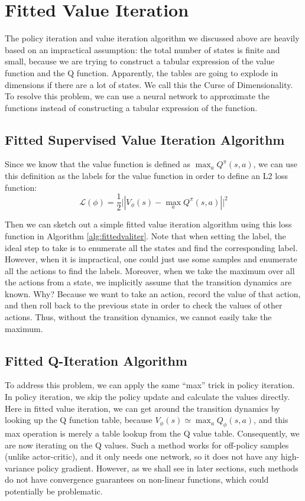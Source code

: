 \section{Fitted Value Iteration}
The policy iteration and value iteration algorithm we discussed above are heavily based on an impractical assumption: the total number of states is finite and small, because we are trying to construct a tabular expression of the value function and the Q function. Apparently, the tables are going to explode in dimensions if there are a lot of states. We call this the Curse of Dimensionality. To resolve this problem, we can use a neural network to approximate the functions instead of constructing a tabular expression of the function. 

\subsection{Fitted Supervised Value Iteration Algorithm}
Since we know that the value function is defined as $\max_a Q^\pi(s,a)$, we can use this definition as the labels for the value function in order to define an L2 loss function:
$$\mathcal{L}(\phi) = \frac{1}{2}\lvert|V_\phi(s) - \max_{a}Q^\pi(s,a)|\rvert^2$$

Then we can sketch out a simple fitted value iteration algorithm using this loss function in Algorithm \ref{alg:fittedvaliter}. Note that when setting the label, the ideal step to take is to enumerate all the states and find the corresponding label. However, when it is impractical, one could just use some samples and enumerate all the actions to find the labels. Moreover, when we take the maximum over all the actions from a state, we implicitly assume that the transition dynamics are known. Why? Because we want to take an action, record the value of that action, and then roll back to the previous state in order to check the values of other actions. Thus, without the transition dynamics, we cannot easily take the maximum.
\subsection{Fitted Q-Iteration Algorithm}
To address this problem, we can apply the same ``max'' trick in policy iteration. In policy iteration, we skip the policy update and calculate the values directly. Here in fitted value iteration, we can get around the transition dynamics by looking up the Q function table, because $V_\phi(s) \simeq \max_{a}Q_\phi(s,a)$, and this max operation is merely a table lookup from the Q value table. Consequently, we are now iterating on the Q values. Such a method works for off-policy samples (unlike actor-critic), and it only needs one network, so it does not have any high-variance policy gradient. However, as we shall see in later sections, such methods do not have convergence guarantees on non-linear functions, which could potentially be problematic.

